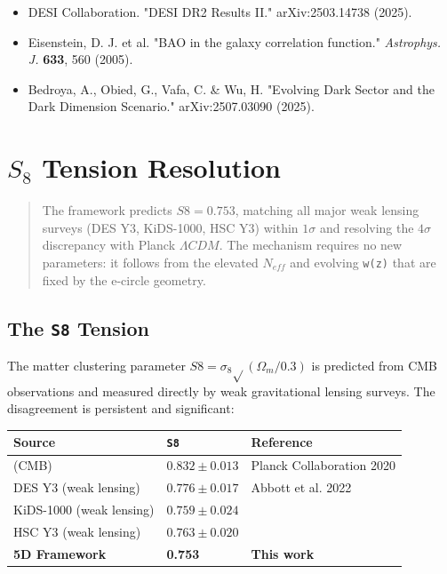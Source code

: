 \documentclass[aps,prd,preprint,superscriptaddress,longbibliography]{revtex4-2}
\begin{document}
\begin{itemize}
  \item DESI Collaboration. "DESI DR2 Results II." arXiv:2503.14738 (2025).
  \item Eisenstein, D. J. et al. "BAO in the galaxy correlation function." \textit{Astrophys. J.} \textbf{633}, 560 (2005).
  \item Bedroya, A., Obied, G., Vafa, C. \& Wu, H. "Evolving Dark Sector and the Dark Dimension Scenario." arXiv:2507.03090 (2025).
\end{itemize}


\section{$S_8$ Tension Resolution}


\begin{quote}
The framework predicts $S8 = 0.753$, matching all major weak lensing
surveys (DES Y3, KiDS-1000, HSC Y3) within $1\sigma$ and resolving the
$4\sigma$ discrepancy with Planck $\Lambda CDM$. The mechanism requires no new
parameters: it follows from the elevated $N_{eff}$ and evolving \texttt{w(z)}
that are fixed by the e-circle geometry.
\end{quote}



\subsection{The \texttt{S8} Tension}

The matter clustering parameter $S8 = \sigma_{8} \sqrt{}(\Omega_m/0.3)$ is predicted from CMB observations and measured directly by weak gravitational lensing surveys. The disagreement is persistent and significant:


\begin{table}[H]
\begin{ruledtabular}
\begin{tabular}{p{5.0cm}p{5.0cm}p{5.0cm}}
Source & \texttt{S8} & Reference \\
\hline
\cite{Planck2018_VI} (CMB) & $0.832 \pm 0.013$ & Planck Collaboration 2020 \\
DES Y3 (weak lensing) & $0.776 \pm 0.017$ & Abbott et al. 2022 \\
KiDS-1000 (weak lensing) & $0.759 \pm 0.024$ & \cite{Heymansetal2021} \\
HSC Y3 (weak lensing) & $0.763 \pm 0.020$ & \cite{Dalaletal2023} \\
\textbf{5D Framework} & \textbf{0.753} & \textbf{This work} \\
\end{tabular}
\end{ruledtabular}
\end{table}
\end{document}
